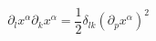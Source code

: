 \begin{equation}
\label{iso1}
\partial_lx^{\alpha}\partial_kx^{\alpha}=\frac{1}{2}\delta_{lk}(\partial_px^{\alpha})^2
\end{equation}

